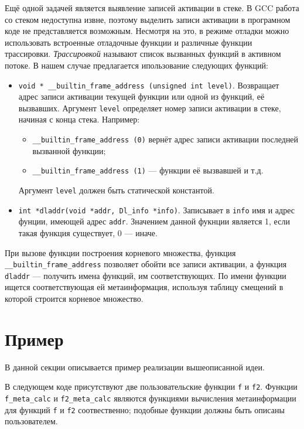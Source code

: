 Ещё одной задачей является выявление записей активации в стеке. В GCC работа со стеком недоступна извне, поэтому выделить записи активации в програмном коде не 
представляется возможным. Несмотря на это, в режиме отладки можно использовать встроенные отладочные функции и различные функции трассировки. \emph{Трассировкой} 
называют список вызванных функций в активном потоке. В нашем случае предлагается ипользование следующих функций:

\begin{itemize}
\item \lstinline{void * __builtin_frame_address (unsigned int level)}. Возвращает адрес записи активации текущей функции или одной из функций, её вызвавших. 
Аргумент \lstinline{level} определяет номер записи активации в стеке, начиная с конца стека. Например:

\begin{itemize}
\item \lstinline{__builtin_frame_address (0)} вернёт адрес записи активации последней вызванной функции;
\item \lstinline{__builtin_frame_address (1)} --- функции её вызвавшей и т.д. 
\end{itemize}

Аргумент \lstinline{level} должен быть статической константой.

\item \lstinline{int *dladdr(void *addr, Dl_info *info)}. Записывает в \lstinline{info} имя и адрес фунции, имеющей адрес \lstinline{addr}. Значением данной 
фукнции является 1, если такая функция существует, 0 --- иначе.
\end{itemize}

При вызове функции построения корневого множества, функция \lstinline{__builtin_frame_address} позволяет обойти все записи активации, а функция \lstinline{dladdr} --- получить имена функций, им соответствующих. По имени функции ищется соответствующая ей метаинформация, используя таблицу смещений в которой строится корневое множество.

\section{Пример}

В данной секции описывается пример реализации вышеописанной идеи.

В следующем коде присутствуют две пользовательские функции \lstinline{f} и \lstinline{f2}. Функции
\lstinline{f_meta_calc} и \lstinline{f2_meta_calc} являются функциями вычисления метаинформации для функций
\lstinline{f} и \lstinline{f2} соотвественно; подобные функции должны быть описаны пользователем.

